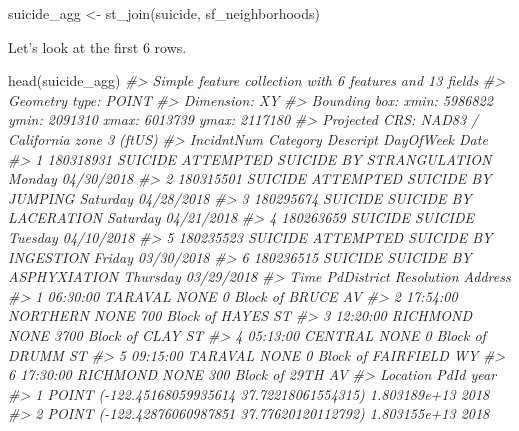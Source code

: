 \documentclass[
]{krantz}
\makeatletter
\newenvironment{Shaded}{\begin{snugshade}}{\end{snugshade}}
\newcommand{\CommentTok}[1]{\textcolor[rgb]{0.37,0.37,0.37}{\textit{#1}}}
\newcommand{\FunctionTok}[1]{\textcolor[rgb]{0,0,0}{#1}}
\newcommand{\NormalTok}[1]{#1}
\newcommand{\OtherTok}[1]{\textcolor[rgb]{0.37,0.37,0.37}{#1}}
\newenvironment{kframe}{%
\medskip{}
\setlength{\fboxsep}{.8em}
 \def\at@end@of@kframe{}%
 \ifinner\ifhmode%
  \def\at@end@of@kframe{\end{minipage}}%
  \begin{minipage}{\columnwidth}%
 \fi\fi%
 \def\FrameCommand##1{\hskip\@totalleftmargin \hskip-\fboxsep
 \colorbox{shadecolor}{##1}\hskip-\fboxsep
     \hskip-\linewidth \hskip-\@totalleftmargin \hskip\columnwidth}%
 \MakeFramed {\advance\hsize-\width
   \@totalleftmargin\z@ \linewidth\hsize
   \@setminipage}}%
 {\par\unskip\endMakeFramed%
 \at@end@of@kframe}
\renewenvironment{Shaded}{\begin{kframe}}{\end{kframe}}
\makeatother
\begin{document}
\begin{Shaded}
\begin{Highlighting}[]
\NormalTok{suicide\_agg }\OtherTok{\textless{}{-}} \FunctionTok{st\_join}\NormalTok{(suicide, sf\_neighborhoods)}
\end{Highlighting}
\end{Shaded}

Let's look at the first 6 rows.

\begin{Shaded}
\begin{Highlighting}[]
\FunctionTok{head}\NormalTok{(suicide\_agg)}
\CommentTok{\#\textgreater{} Simple feature collection with 6 features and 13 fields}
\CommentTok{\#\textgreater{} Geometry type: POINT}
\CommentTok{\#\textgreater{} Dimension:     XY}
\CommentTok{\#\textgreater{} Bounding box:  xmin: 5986822 ymin: 2091310 xmax: 6013739 ymax: 2117180}
\CommentTok{\#\textgreater{} Projected CRS: NAD83 / California zone 3 (ftUS)}
\CommentTok{\#\textgreater{}   IncidntNum Category                           Descript DayOfWeek       Date}
\CommentTok{\#\textgreater{} 1  180318931  SUICIDE ATTEMPTED SUICIDE BY STRANGULATION    Monday 04/30/2018}
\CommentTok{\#\textgreater{} 2  180315501  SUICIDE       ATTEMPTED SUICIDE BY JUMPING  Saturday 04/28/2018}
\CommentTok{\#\textgreater{} 3  180295674  SUICIDE              SUICIDE BY LACERATION  Saturday 04/21/2018}
\CommentTok{\#\textgreater{} 4  180263659  SUICIDE                            SUICIDE   Tuesday 04/10/2018}
\CommentTok{\#\textgreater{} 5  180235523  SUICIDE     ATTEMPTED SUICIDE BY INGESTION    Friday 03/30/2018}
\CommentTok{\#\textgreater{} 6  180236515  SUICIDE            SUICIDE BY ASPHYXIATION  Thursday 03/29/2018}
\CommentTok{\#\textgreater{}       Time PdDistrict Resolution                 Address}
\CommentTok{\#\textgreater{} 1 06:30:00    TARAVAL       NONE     0 Block of BRUCE AV}
\CommentTok{\#\textgreater{} 2 17:54:00   NORTHERN       NONE   700 Block of HAYES ST}
\CommentTok{\#\textgreater{} 3 12:20:00   RICHMOND       NONE   3700 Block of CLAY ST}
\CommentTok{\#\textgreater{} 4 05:13:00    CENTRAL       NONE     0 Block of DRUMM ST}
\CommentTok{\#\textgreater{} 5 09:15:00    TARAVAL       NONE 0 Block of FAIRFIELD WY}
\CommentTok{\#\textgreater{} 6 17:30:00   RICHMOND       NONE    300 Block of 29TH AV}
\CommentTok{\#\textgreater{}                                         Location         PdId year}
\CommentTok{\#\textgreater{} 1  POINT ({-}122.45168059935614 37.72218061554315) 1.803189e+13 2018}
\CommentTok{\#\textgreater{} 2  POINT ({-}122.42876060987851 37.77620120112792) 1.803155e+13 2018}

\end{Highlighting}
\end{Shaded}
\end{document}
